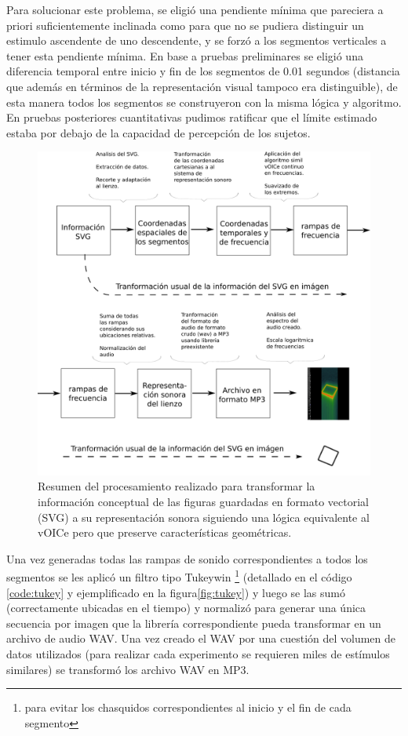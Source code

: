 \documentclass{article}
\numberwithin{figure}{section}
\begin{document}
    Para solucionar este problema, se eligió una pendiente mínima que pareciera a priori suficientemente inclinada como para que no se pudiera distinguir un estimulo ascendente de uno descendente, y se forzó a los segmentos verticales a tener esta pendiente mínima. En base a pruebas preliminares se eligió una diferencia temporal entre inicio y fin de los segmentos de 0.01 segundos (distancia que además en términos de la representación visual tampoco era distinguible), de esta manera todos los segmentos se construyeron con la misma lógica y algoritmo. En pruebas posteriores cuantitativas pudimos ratificar que el límite estimado estaba por debajo de la capacidad de percepción de los sujetos. 
    
    \begin{figure}
        \center
        \includegraphics[width=\textwidth]{Imagenes/diagramaSVG2.png}
        \caption{Resumen del procesamiento realizado para transformar la información conceptual de las figuras guardadas en formato vectorial (SVG) a su representación sonora siguiendo una lógica equivalente al vOICe pero que preserve características geométricas.}
        \label{fig:diagramaSVG}
    \end{figure}
    
    Una vez generadas todas las rampas de sonido correspondientes a todos los segmentos se les aplicó un filtro tipo Tukeywin \footnote{para evitar los chasquidos correspondientes al inicio y el fin de cada segmento} (detallado en el código \ref{code:tukey} y ejemplificado en la figura\ref{fig:tukey}) y luego se las sumó (correctamente ubicadas en el tiempo) y normalizó para generar una única secuencia por imagen que la librería correspondiente pueda transformar en un archivo de audio WAV. Una vez creado el WAV por una cuestión del volumen de datos utilizados (para realizar cada experimento se requieren miles de estímulos similares) se transformó los archivo WAV en MP3. 
\end{document}

